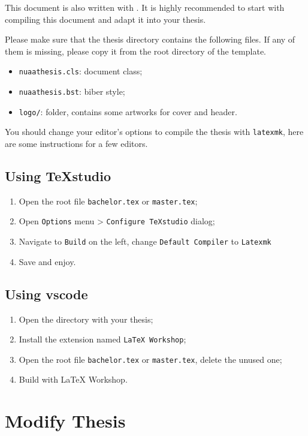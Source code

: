 This document is also written with \nuaathesis.
It is highly recommended to start with compiling this document and adapt it into your thesis.

Please make sure that the thesis directory contains the following files.
If any of them is missing, please copy it from the root directory of the template.
\begin{itemize}
  \item \verb|nuaathesis.cls|: document class;
  \item \verb|nuaathesis.bst|: biber style;
  \item \verb|logo/|: folder, contains some artworks for cover and header.
\end{itemize}

You should change your editor's options to compile the thesis with \verb|latexmk|,
here are some instructions for a few editors.

\subsection{Using TeXstudio}
\begin{enumerate}
\item Open the root file \verb|bachelor.tex| or \verb|master.tex|;
\item Open \verb|Options| menu > \verb|Configure TeXstudio| dialog;
\item Navigate to \verb|Build| on the left, change \verb|Default Compiler| to \verb|Latexmk|
\item Save and enjoy.
\end{enumerate}

\subsection{Using vscode}
\begin{enumerate}
\item Open the directory with your thesis;
\item Install the extension named \verb|LaTeX Workshop|;
\item Open the root file \verb|bachelor.tex| or \verb|master.tex|, delete the unused one;
\item Build with LaTeX Workshop.
\end{enumerate}

\section{Modify Thesis}

